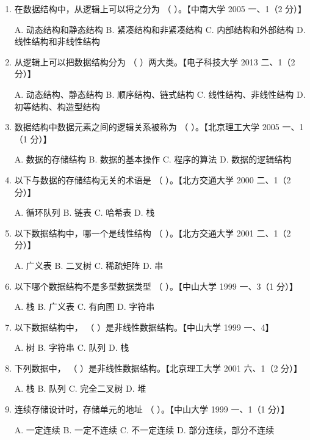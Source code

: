 \documentclass[lang=cn,newtx,10pt,scheme=chinese]{elegantbook}
\begin{document}
\begin{enumerate}
    \item 在数据结构中，从逻辑上可以将之分为 （ \quad）。【中南大学 2005 一、1（2 分）】  
    
    A. 动态结构和静态结构  
    B. 紧凑结构和非紧凑结构  
    C. 内部结构和外部结构  
    D. 线性结构和非线性结构  

    \item 从逻辑上可以把数据结构分为 （ \quad）两大类。【电子科技大学 2013 二、1（2 分）】  
    
    A. 动态结构、静态结构  
    B. 顺序结构、链式结构  
    C. 线性结构、非线性结构  
    D. 初等结构、构造型结构  

    \item 数据结构中数据元素之间的逻辑关系被称为 （ \quad）。【北京理工大学 2005 一、1（1 分）】  
   
    A. 数据的存储结构  
    B. 数据的基本操作  
    C. 程序的算法  
    D. 数据的逻辑结构  

    \item 以下与数据的存储结构无关的术语是 （ \quad）。【北方交通大学 2000 二、1（2 分）】  
   
    A. 循环队列  
    B. 链表  
    C. 哈希表  
    D. 栈  

    \item 以下数据结构中，哪一个是线性结构 （ \quad）。【北方交通大学 2001 二、1（2 分）】  
    
    A. 广义表  
    B. 二叉树  
    C. 稀疏矩阵  
    D. 串  

    \item 以下哪个数据结构不是多型数据类型 （ \quad）。【中山大学 1999 一、3（1 分）】  
    
    A. 栈  
    B. 广义表  
    C. 有向图  
    D. 字符串  

    \item 以下数据结构中， （ \quad）是非线性数据结构。【中山大学 1999 一、4】  
    
    A. 树  
    B. 字符串  
    C. 队列  
    D. 栈  

    \item 下列数据中， （ \quad）是非线性数据结构。【北京理工大学 2001 六、1（2 分）】  
    
    A. 栈  
    B. 队列  
    C. 完全二叉树  
    D. 堆  

    \item 连续存储设计时，存储单元的地址 （ \quad）。【中山大学 1999 一、1（1 分）】  
   
    A. 一定连续  
    B. 一定不连续  
    C. 不一定连续  
    D. 部分连续，部分不连续  


\end{enumerate}
\end{document}
